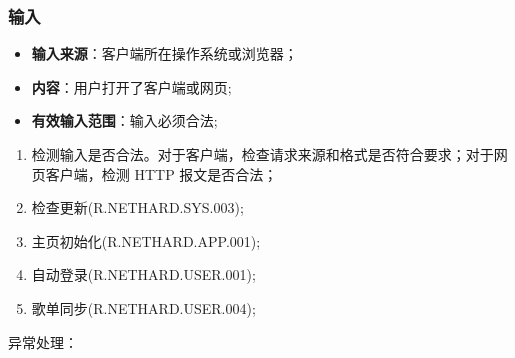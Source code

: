 \subsubsection{输入}
	\begin{itemize}
		\item \textbf{输入来源}：客户端所在操作系统或浏览器；
		\item \textbf{内容}：用户打开了客户端或网页;
		\item \textbf{有效输入范围}：输入必须合法;
	\end{itemize}
\begin{enumerate}
\item 检测输入是否合法。对于客户端，检查请求来源和格式是否符合要求；对于网页客户端，检测 HTTP 报文是否合法；
\item 检查更新(R.NETHARD.SYS.003);
\item 主页初始化(R.NETHARD.APP.001);
\item 自动登录(R.NETHARD.USER.001);
\item 歌单同步(R.NETHARD.USER.004);
\end{enumerate}
\noindent 异常处理：
